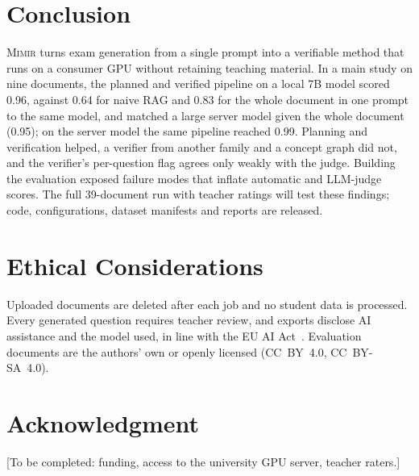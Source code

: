 \documentclass[conference]{IEEEtran}
\newcommand{\Mimir}{\textsc{Mimir}}
\begin{document}
\section{Conclusion}

\Mimir{} turns exam generation from a single prompt into a verifiable method that runs on a consumer
GPU without retaining teaching material. In a main study on nine documents, the planned and verified
pipeline on a local 7B model scored 0.96, against 0.64 for naive RAG and 0.83 for the whole document in one
prompt to the same model, and matched a large server model given the whole document (0.95); on the server
model the same pipeline reached 0.99. Planning and verification helped, a verifier from another family and
a concept graph did not, and the verifier's per-question flag agrees only weakly with the judge. Building
the evaluation exposed failure modes that inflate automatic and LLM-judge scores. The full 39-document run with teacher ratings
will test these findings; code, configurations, dataset manifests and reports are released.

\section*{Ethical Considerations}
Uploaded documents are deleted after each job and no student data is processed. Every generated
question requires teacher review, and exports disclose AI assistance and the model used, in line with
the EU AI Act~\cite{aiact2024}. Evaluation documents are the authors' own or openly licensed (CC~BY~4.0,
CC~BY-SA~4.0).

\section*{Acknowledgment}
[To be completed: funding, access to the university GPU server, teacher raters.]



\end{document}

